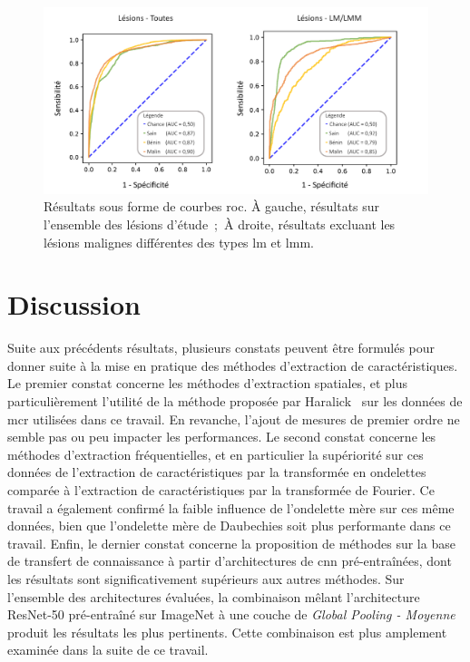 \begin{figure}[H]
    \centering
    \includegraphics[width=\textwidth]{contents/chapter_5/resources/results_image_classification_roc.pdf}
    \caption{Résultats sous forme de courbes \gls{roc}. À gauche, résultats sur l'ensemble des lésions d'étude~;~À droite, résultats excluant les lésions malignes différentes des types \gls{lm} et \gls{lmm}.}
    \label{fig:results_image_classification_roc}
\end{figure}\par

\section{Discussion}
Suite aux précédents résultats, plusieurs constats peuvent être formulés pour donner suite à la mise en pratique des méthodes d'extraction de caractéristiques. Le premier constat concerne les méthodes d'extraction spatiales, et plus particulièrement l'utilité de la méthode proposée par Haralick~ sur les données de \gls{mcr} utilisées dans ce travail. En revanche, l'ajout de mesures de premier ordre ne semble pas ou peu impacter les performances. Le second constat concerne les méthodes d'extraction fréquentielles, et en particulier la supériorité sur ces données de l'extraction de caractéristiques par la transformée en ondelettes comparée à l'extraction de caractéristiques par la transformée de Fourier. Ce travail a également confirmé la faible influence de l'ondelette mère sur ces même données, bien que l'ondelette mère de Daubechies soit plus performante dans ce travail. Enfin, le dernier constat concerne la proposition de méthodes sur la base de transfert de connaissance à partir d'architectures de \gls{cnn} pré-entraînées, dont les résultats sont significativement supérieurs aux autres méthodes. Sur l'ensemble des architectures évaluées, la combinaison mêlant l'architecture ResNet-50 pré-entraîné sur ImageNet à une couche de \textit{Global Pooling - Moyenne} produit les résultats les plus pertinents. Cette combinaison est plus amplement examinée dans la suite de ce travail.\par

